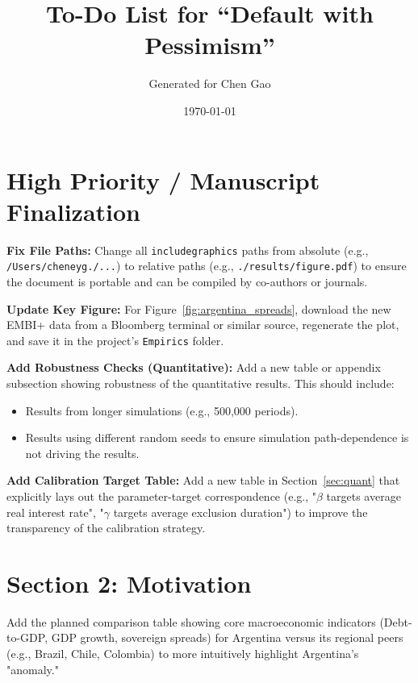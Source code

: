 \documentclass[12pt]{article}
\title{To-Do List for ``Default with Pessimism''}
\author{Generated for Chen Gao}
\date{\today}
\begin{document}
\maketitle

\section{High Priority / Manuscript Finalization}
\begin{todolist}
    \item \textbf{Fix File Paths:} Change all \texttt{includegraphics} paths from absolute (e.g., \texttt{/Users/cheneyg./...}) to relative paths (e.g., \texttt{./results/figure.pdf}) to ensure the document is portable and can be compiled by co-authors or journals.
    \item \textbf{Update Key Figure:} For Figure~\ref{fig:argentina_spreads}, download the new EMBI+ data from a Bloomberg terminal or similar source, regenerate the plot, and save it in the project's \texttt{Empirics} folder.
    \item \textbf{Add Robustness Checks (Quantitative):} Add a new table or appendix subsection showing robustness of the quantitative results. This should include:
    \begin{itemize}
        \item Results from longer simulations (e.g., 500,000 periods).
        \item Results using different random seeds to ensure simulation path-dependence is
              not driving the results.
    \end{itemize}
    \item \textbf{Add Calibration Target Table:} Add a new table in Section~\ref{sec:quant} that explicitly lays out the parameter-target correspondence (e.g., "$\beta$ targets average real interest rate", "$\gamma$ targets average exclusion duration") to improve the transparency of the calibration strategy.
\end{todolist}

\section{Section 2: Motivation}
\begin{todolist}
    \item Add the planned comparison table showing core macroeconomic indicators
    (Debt-to-GDP, GDP growth, sovereign spreads) for Argentina versus its regional
    peers (e.g., Brazil, Chile, Colombia) to more intuitively highlight Argentina's
    "anomaly."
\end{todolist}
\end{document}
